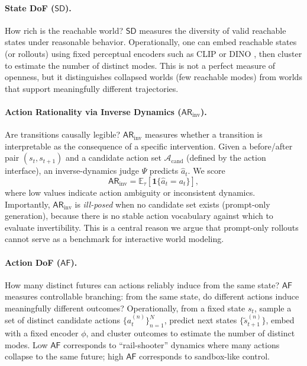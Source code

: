 \documentclass{article}
\theoremstyle{plain}
\theoremstyle{definition}
\theoremstyle{remark}
\begin{document}
\paragraph{State DoF ($\mathsf{SD}$).}
How rich is the reachable world? $\mathsf{SD}$ measures the diversity of valid reachable states under reasonable behavior. Operationally, one can embed reachable states (or rollouts) using fixed perceptual encoders such as CLIP or DINO \cite{radford2021clip,caron2021dino}, then cluster to estimate the number of distinct modes. This is not a perfect measure of openness, but it distinguishes collapsed worlds (few reachable modes) from worlds that support meaningfully different trajectories.

\paragraph{Action Rationality via Inverse Dynamics ($\mathsf{AR}_{\text{inv}}$).}
Are transitions causally legible? $\mathsf{AR}_{\text{inv}}$ measures whether a transition is interpretable as the consequence of a specific intervention. Given a before/after pair $(s_t, s_{t+1})$ and a candidate action set $\mathcal{A}_{\text{cand}}$ (defined by the action interface), an inverse-dynamics judge $\Psi$ predicts $\hat a_t$. We score
\[
\mathsf{AR}_{\text{inv}} = \mathbb{E}_\tau[\mathbf{1}\{\hat a_t = a_t\}],
\]
where low values indicate action ambiguity or inconsistent dynamics. Importantly, $\mathsf{AR}_{\text{inv}}$ is \emph{ill-posed} when no candidate set exists (prompt-only generation), because there is no stable action vocabulary against which to evaluate invertibility. This is a central reason we argue that prompt-only rollouts cannot serve as a benchmark for interactive world modeling.

\paragraph{Action DoF ($\mathsf{AF}$).}
How many distinct futures can actions reliably induce from the same state? $\mathsf{AF}$ measures controllable branching: from the same state, do different actions induce meaningfully different outcomes? Operationally, from a fixed state $s_t$, sample a set of distinct candidate actions $\{a_t^{(n)}\}_{n=1}^N$, predict next states $\{\tilde s_{t+1}^{(n)}\}$, embed with a fixed encoder $\phi$, and cluster outcomes to estimate the number of distinct modes. Low $\mathsf{AF}$ corresponds to ``rail-shooter'' dynamics where many actions collapse to the same future; high $\mathsf{AF}$ corresponds to sandbox-like control.
\end{document}
